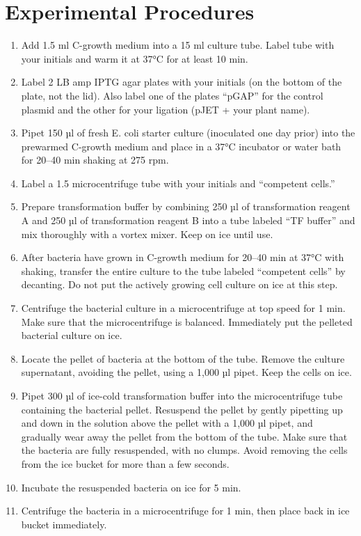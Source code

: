 \documentclass[]{book}
\providecommand{\tightlist}{%
  \setlength{\itemsep}{0pt}\setlength{\parskip}{0pt}}
\theoremstyle{definition}
\theoremstyle{definition}
\theoremstyle{definition}
\theoremstyle{remark}
\begin{document}
\section{Experimental Procedures}\label{experimental-procedures-14}

\begin{enumerate}
\def\labelenumi{\arabic{enumi}.}
\tightlist
\item
  Add 1.5 ml C-growth medium into a 15 ml culture tube. Label tube with
  your initials and warm it at 37°C for at least 10 min.
\item
  Label 2 LB amp IPTG agar plates with your initials (on the bottom of
  the plate, not the lid). Also label one of the plates ``pGAP'' for the
  control plasmid and the other for your ligation (pJET + your plant
  name).
\item
  Pipet 150 µl of fresh E. coli starter culture (inoculated one day
  prior) into the prewarmed C-growth medium and place in a 37°C
  incubator or water bath for 20--40 min shaking at 275 rpm.
\item
  Label a 1.5 microcentrifuge tube with your initials and ``competent
  cells.''
\item
  Prepare transformation buffer by combining 250 µl of transformation
  reagent A and 250 µl of transformation reagent B into a tube labeled
  ``TF buffer'' and mix thoroughly with a vortex mixer. Keep on ice
  until use.
\item
  After bacteria have grown in C-growth medium for 20--40 min at 37°C
  with shaking, transfer the entire culture to the tube labeled
  ``competent cells'' by decanting. Do not put the actively growing cell
  culture on ice at this step.
\item
  Centrifuge the bacterial culture in a microcentrifuge at top speed for
  1 min. Make sure that the microcentrifuge is balanced. Immediately put
  the pelleted bacterial culture on ice.
\item
  Locate the pellet of bacteria at the bottom of the tube. Remove the
  culture supernatant, avoiding the pellet, using a 1,000 µl pipet. Keep
  the cells on ice.
\item
  Pipet 300 µl of ice-cold transformation buffer into the
  microcentrifuge tube containing the bacterial pellet. Resuspend the
  pellet by gently pipetting up and down in the solution above the
  pellet with a 1,000 µl pipet, and gradually wear away the pellet from
  the bottom of the tube. Make sure that the bacteria are fully
  resuspended, with no clumps. Avoid removing the cells from the ice
  bucket for more than a few seconds.
\item
  Incubate the resuspended bacteria on ice for 5 min.
\item
  Centrifuge the bacteria in a microcentrifuge for 1 min, then place
  back in ice bucket immediately.
\end{enumerate}
\end{document}
